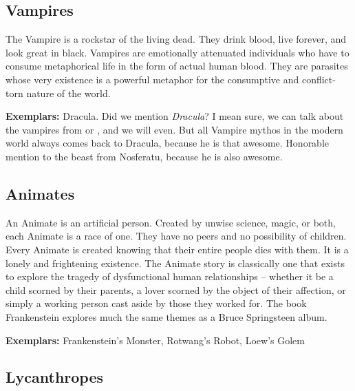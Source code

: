 \subsection{Vampires} 

The Vampire is a rockstar of the living dead. They drink blood, live forever, and look great in black. Vampires are emotionally attenuated individuals who have to consume metaphorical life in the form of actual human blood. They are parasites whose very existence is a powerful metaphor for the consumptive and conflict-torn nature of the world.

\textbf{Exemplars:} Dracula. Did we mention \textit{Dracula}? I mean sure, we can talk about the vampires from  or , and we will even. But all Vampire mythos in the modern world always comes back to Dracula, because he is that awesome. Honorable mention to the beast from Nosferatu, because he is also awesome.

\subsection{Animates} 

An Animate is an artificial person. Created by unwise science, magic, or both, each Animate is a race of one. They have no peers and no possibility of children. Every Animate is created knowing that their entire people dies with them. It is a lonely and frightening existence. The Animate story is classically one that exists to explore the tragedy of dysfunctional human relationships -- whether it be a child scorned by their parents, a lover scorned by the object of their affection, or simply a working person cast aside by those they worked for. The book Frankenstein explores much the same themes as a Bruce Springsteen album. 

\textbf{Exemplars:} Frankenstein's Monster, Rotwang's Robot, Loew's Golem

\subsection{Lycanthropes} 

